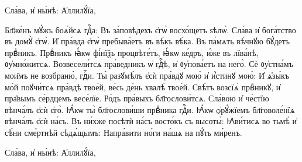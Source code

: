 \hKv Сла́ва, и҆ ны́нѣ: А҆ллилꙋ́їа,  





\cuLettrine
Бл҃же́нъ мꙋ́жъ боѧ́йсѧ гдⷭ҇а: 
\hKv Въ за́повѣдехъ  є҆гѡ̀ восхо́щетъ ѕѣлѡ̀. 
\hKv Сла́ва и҆ бога́тство въ домꙋ̀  є҆гѡ̀. 
\hKv И҆ пра́вда є҆гѡ̀ пребыва́етъ въ вѣ́къ вѣ́ка.  
\hKv Въ па́мѧть вѣ́чнꙋю бꙋ́детъ првⷣникъ. 
\hKv Првⷣникъ  ꙗ҆́кѡ фі́нїѯъ процвѣте́тъ, ꙗ҆́кѡ ке́дръ, и҆́же въ  лїва́нѣ, ᲂу҆мно́житсѧ. 
\hKv Возвесели́тсѧ пра́ведникъ ѡ҆  гдⷭ҇ѣ, и҆ ᲂу҆пова́етъ на него̀. 
\hKv Сѐ ᲂу҆стна́мъ  мои̑мъ не возбраню̀, гдⷭ҇и. 
\hKv Ты̀ разꙋмѣ́лъ є҆сѝ  пра́вдꙋ мою̀ и҆ и҆́стинꙋ мою̀: 
\hKv И҆ ѧ҆зы́къ мо́й  поꙋчи́тсѧ пра́вдѣ твое́й, ве́сь де́нь хвалѣ̀ твое́й. 
\hKv  Свѣ́тъ возсїѧ̀ првⷣникꙋ, и҆ пра̑вымъ се́рдцемъ весе́лїе.  
\hKv Ро́дъ пра́выхъ бл҃гослови́тсѧ. 
\hKv Сла́вою и҆ че́стїю  вѣнча́лъ є҆сѝ є҆го̀. 
\hKv Ꙗ҆́кѡ ты̀ бл҃гослови́ши  првⷣника гдⷭ҇и. 
\hKv Ꙗ҆́кѡ ѻ҆рꙋ́жїемъ бл҃говоле́нїѧ  вѣнча́лъ є҆сѝ на́съ. 
\hKv Въ ни́хже посѣтѝ на́съ  восто́къ съ высоты̀: 
\hKv Ꙗ҆ви́тисѧ во тьмѣ̀ и҆ сѣ́ни  сме́ртнѣй сѣдѧ́щымъ: 
\hKv Напра́вити но́ги на́шѧ на пꙋ́ть  ми́ренъ.  

\hKv Сла́ва, и҆ ны́нѣ: А҆ллилꙋ́їа,  



%



